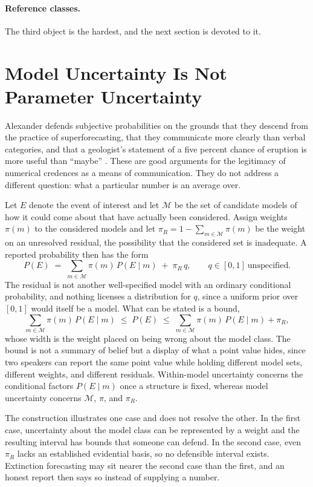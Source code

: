 \documentclass[11pt]{article}
\begin{document}
\paragraph{Reference classes.} The third object is the hardest, and the next section is devoted to it.

\section{Model Uncertainty Is Not Parameter Uncertainty}\label{sec:model}

Alexander defends subjective probabilities on the grounds that they descend from the practice of superforecasting, that they communicate more clearly than verbal categories, and that a geologist's statement of a five percent chance of eruption is more useful than ``maybe'' \cite{tetlock2015}. These are good arguments for the legitimacy of numerical credences as a means of communication. They do not address a different question: what a particular number is an average over.

Let $E$ denote the event of interest and let $\mathcal{M}$ be the set of candidate models of how it could come about that have actually been considered. Assign weights $\pi(m)$ to the considered models and let $\pi_R = 1 - \sum_{m\in\mathcal{M}}\pi(m)$ be the weight on an unresolved residual, the possibility that the considered set is inadequate. A reported probability then has the form
\[
P(E) \;=\; \sum_{m\in\mathcal{M}} \pi(m)\, P(E \mid m) \;+\; \pi_R\, q, \qquad q \in [0,1]\ \text{unspecified}.
\]
The residual is not another well-specified model with an ordinary conditional probability, and nothing licenses a distribution for $q$, since a uniform prior over $[0,1]$ would itself be a model. What can be stated is a bound,
\[
\sum_{m\in\mathcal{M}} \pi(m)\, P(E \mid m) \;\le\; P(E) \;\le\; \sum_{m\in\mathcal{M}} \pi(m)\, P(E \mid m) + \pi_R,
\]
whose width is the weight placed on being wrong about the model class. The bound is not a summary of belief but a display of what a point value hides, since two speakers can report the same point value while holding different model sets, different weights, and different residuals. Within-model uncertainty concerns the conditional factors $P(E\mid m)$ once a structure is fixed, whereas model uncertainty concerns $\mathcal{M}$, $\pi$, and $\pi_R$.

The construction illustrates one case and does not resolve the other. In the first case, uncertainty about the model class can be represented by a weight and the resulting interval has bounds that someone can defend. In the second case, even $\pi_R$ lacks an established evidential basis, so no defensible interval exists. Extinction forecasting may sit nearer the second case than the first, and an honest report then says so instead of supplying a number.
\end{document}
